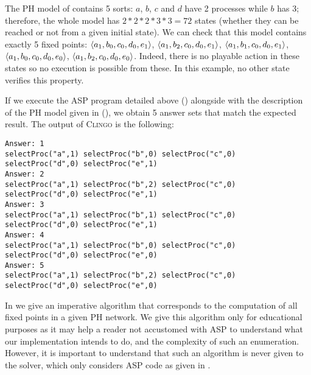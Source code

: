 \begin{example}
The PH model of  contains 5 sorts:
$a$, $b$, $c$ and $d$ have 2 processes while $b$ has 3; therefore, the whole model has $2*2*2*3*3 = 72$ states (whether they can be reached or not from a given initial state).
We can check that this model contains exactly 5 fixed points: $\mbox{$\langle a_1, b_0, c_0, d_0, e_1 \rangle$}$, $\mbox{$\langle a_1, b_2, c_0, d_0, e_1 \rangle$}$, $\mbox{$\langle a_1, b_1, c_0, d_0, e_1 \rangle$}$, $\mbox{$\langle a_1, b_0, c_0, d_0, e_0 \rangle$}$, $\mbox{$\langle a_1, b_2, c_0, d_0, e_0 \rangle$}$.
Indeed, there is no playable action in these states so no execution is possible from these. In this example, no other state verifies this property.

If we execute the ASP program detailed above ()
alongside with the description of the PH model given in  (),
we obtain 5 answer sets that match the expected result.
The output of \textsc{Clingo} is the following:
\addtocounter{lstnumber}{-15}
\begin{lstlisting}[numbers=none]
Answer: 1
selectProc("a",1) selectProc("b",0) selectProc("c",0)
selectProc("d",0) selectProc("e",1)
Answer: 2
selectProc("a",1) selectProc("b",2) selectProc("c",0)
selectProc("d",0) selectProc("e",1)
Answer: 3
selectProc("a",1) selectProc("b",1) selectProc("c",0)
selectProc("d",0) selectProc("e",1)
Answer: 4
selectProc("a",1) selectProc("b",0) selectProc("c",0)
selectProc("d",0) selectProc("e",0)
Answer: 5
selectProc("a",1) selectProc("b",2) selectProc("c",0)
selectProc("d",0) selectProc("e",0)
\end{lstlisting}
\end{example}

In  we give an imperative algorithm
that corresponds to the computation of
all fixed points in a given PH network.
We give this algorithm only for educational purposes
as it may help a reader not accustomed with ASP to understand
what our implementation intends to do,
and the complexity of such an enumeration.
However, it is important to understand that
such an algorithm is never given to the solver,
which only considers ASP code as given in .

